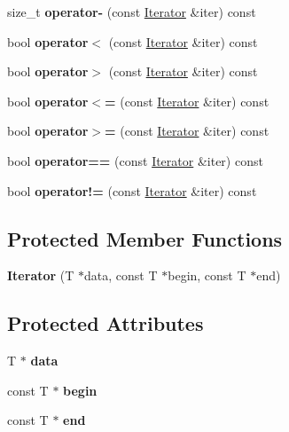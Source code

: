 \begin{DoxyCompactItemize}
\hypertarget{classIterator_a7e9d9cb29073bcb84a2ea5535123b657}{}\label{classIterator_a7e9d9cb29073bcb84a2ea5535123b657} 
size\+\_\+t {\bfseries operator-\/} (const \hyperlink{classIterator}{Iterator} \&iter) const
\item 
\hypertarget{classIterator_a6d99a1e700d42466e0c14c91e87699b9}{}\label{classIterator_a6d99a1e700d42466e0c14c91e87699b9} 
bool {\bfseries operator$<$} (const \hyperlink{classIterator}{Iterator} \&iter) const
\item 
\hypertarget{classIterator_ae095b424d8866d2d60eaef1760fcacbe}{}\label{classIterator_ae095b424d8866d2d60eaef1760fcacbe} 
bool {\bfseries operator$>$} (const \hyperlink{classIterator}{Iterator} \&iter) const
\item 
\hypertarget{classIterator_a5d066a1f9dbbf95233d7bd44eb3484ae}{}\label{classIterator_a5d066a1f9dbbf95233d7bd44eb3484ae} 
bool {\bfseries operator$<$=} (const \hyperlink{classIterator}{Iterator} \&iter) const
\item 
\hypertarget{classIterator_ab50333dc2ff4fd6b1b23b7eb39b602ce}{}\label{classIterator_ab50333dc2ff4fd6b1b23b7eb39b602ce} 
bool {\bfseries operator$>$=} (const \hyperlink{classIterator}{Iterator} \&iter) const
\item 
\hypertarget{classIterator_aedd5367f618d50c0664c1e9e1caf848b}{}\label{classIterator_aedd5367f618d50c0664c1e9e1caf848b} 
bool {\bfseries operator==} (const \hyperlink{classIterator}{Iterator} \&iter) const
\item 
\hypertarget{classIterator_a2b19ea3c082f76a4497c5c8416fded92}{}\label{classIterator_a2b19ea3c082f76a4497c5c8416fded92} 
bool {\bfseries operator!=} (const \hyperlink{classIterator}{Iterator} \&iter) const
\end{DoxyCompactItemize}
\subsection*{Protected Member Functions}
\begin{DoxyCompactItemize}
\item 
\hypertarget{classIterator_ad38bf9cf53766a2adaf5a6654e3f3ac2}{}\label{classIterator_ad38bf9cf53766a2adaf5a6654e3f3ac2} 
{\bfseries Iterator} (T $\ast$data, const T $\ast$begin, const T $\ast$end)
\end{DoxyCompactItemize}
\subsection*{Protected Attributes}
\begin{DoxyCompactItemize}
\item 
\hypertarget{classIterator_a816091a33e21f9884091f7053f3dbb52}{}\label{classIterator_a816091a33e21f9884091f7053f3dbb52} 
T $\ast$ {\bfseries data}
\item 
\hypertarget{classIterator_a07cc2bb59a32e5b965ef97b525cd6ea5}{}\label{classIterator_a07cc2bb59a32e5b965ef97b525cd6ea5} 
const T $\ast$ {\bfseries begin}
\item 
\hypertarget{classIterator_ac56608a177d543b52e8f91f47409b0a1}{}\label{classIterator_ac56608a177d543b52e8f91f47409b0a1} 
const T $\ast$ {\bfseries end}
\end{DoxyCompactItemize}
